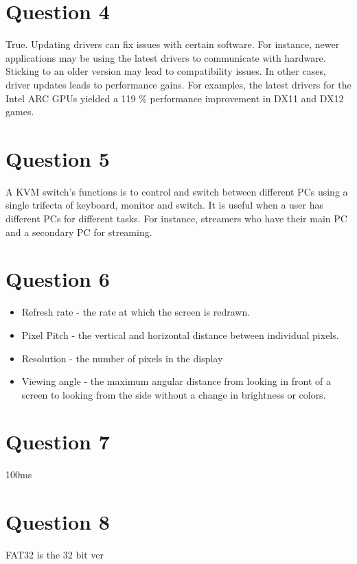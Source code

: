 \documentclass[12pt, a4paper]{article}
\begin{document}
\section{Question 4}
True. Updating drivers can fix issues with certain software.
For instance, newer applications may
be using the latest drivers to communicate with hardware. Sticking to an
older version may lead to compatibility issues. In other cases, driver updates
leads to performance gains. For examples, the latest drivers for the 
Intel ARC GPUs yielded a 119 \% performance improvement in DX11 and DX12 games.

\section{Question 5}
A KVM switch's functions is to control and switch between different PCs
using a single trifecta of keyboard, monitor and switch. It is useful
when a user has different PCs for different tasks. For instance, streamers
who have their main PC and a secondary PC for streaming.

\section{Question 6}
\begin{itemize}
  \item Refresh rate - the rate at which the screen is redrawn. 
  \item Pixel Pitch - the vertical and horizontal distance between individual pixels.
  \item Resolution - the number of pixels in the display
  \item Viewing angle - the maximum angular distance from looking in front of a screen
    to looking from the side without a change in brightness or colors.
\end{itemize}

\section{Question 7}
100ms

\section{Question 8}

FAT32 is the 32 bit ver
\end{document}
